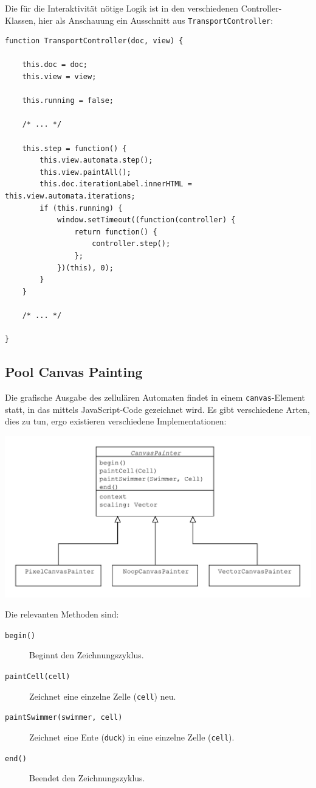 \documentclass[11pt]{report} %
\theoremstyle{definition}
\begin{document}
Die für die Interaktivität nötige Logik ist in den verschiedenen Controller-Klassen, hier als Anschauung ein Ausschnitt aus {\tt TransportController}:

\begin{lstlisting}
function TransportController(doc, view) {
	
	this.doc = doc;
	this.view = view;
	
	this.running = false;

	/* ... */

	this.step = function() {
		this.view.automata.step();
		this.view.paintAll();
		this.doc.iterationLabel.innerHTML = this.view.automata.iterations;
		if (this.running) {
			window.setTimeout((function(controller) {
				return function() {
					controller.step();
				};
			})(this), 0);
		}
	}

	/* ... */

}
\end{lstlisting}

\subsection{Pool Canvas Painting}

Die grafische Ausgabe des zellulären Automaten findet in einem {\tt canvas}-Element statt, in das mittels JavaScript-Code gezeichnet wird. Es gibt verschiedene Arten, dies zu tun, ergo existieren verschiedene Implementationen:

\includegraphics[scale=0.7]{uml/Painters.pdf}

Die relevanten Methoden sind:

\begin{description}
\item[\tt begin()] Beginnt den Zeichnungszyklus.
\item[\tt paintCell(cell)] Zeichnet eine einzelne Zelle ({\tt cell}) neu.
\item[\tt paintSwimmer(swimmer, cell)] Zeichnet eine Ente ({\tt duck}) in eine einzelne Zelle ({\tt cell}).
\item[\tt end()] Beendet den Zeichnungszyklus.
\end{description}
\end{document}
